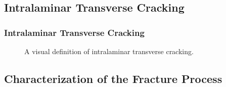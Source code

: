 \documentclass[first,firstsupp,lastsupp,handout,last,hyperref,table]{ETHclass}
\begin{document}
\subsection[Cracking in FRPC]{Intralaminar Transverse Cracking}

\begin{frame}
\frametitle{Intralaminar Transverse Cracking}
\vspace{-0.75cm}
\centering
\captionsetup[subfigure]{labelfont=footnotesize}
\begin{figure}[!h]
\centering
{}\quad
{}
 \caption{A visual definition of intralaminar transverse cracking.}
  \label{fig:intralaminar-cracks}
\end{figure}
\end{frame}

\subsection[Characterization]{Characterization of the Fracture Process}
\end{document}
